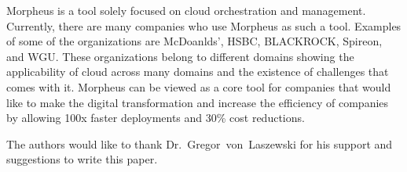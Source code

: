 Morpheus is a tool solely focused on cloud orchestration and management. 
Currently, there are many companies who use Morpheus as such a tool. 
Examples of some of the organizations are McDoanlds', HSBC, BLACKROCK, Spireon, 
and WGU. These organizations belong to different domains showing the 
applicability of cloud across many domains and the existence of challenges 
that comes with it. Morpheus can be viewed as a core tool for companies that 
would like to make the digital transformation and increase the efficiency of 
companies by allowing 100x faster deployments and 30\% cost reductions.  

\begin{acks}

  The authors would like to thank Dr.~Gregor~von~Laszewski for his
  support and suggestions to write this paper.

\end{acks}


 


